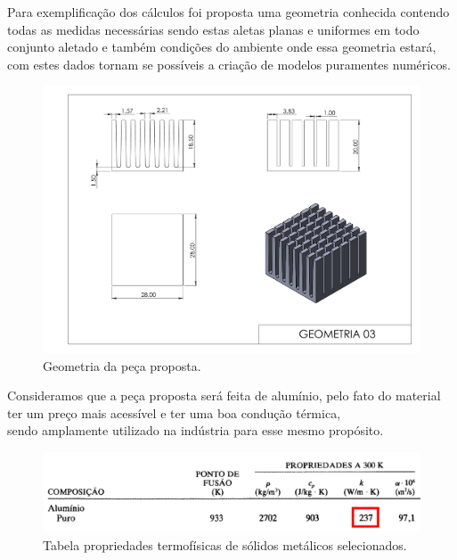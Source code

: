 
\vspace{-1.5cm}Para exemplificação dos cálculos foi proposta uma geometria conhecida contendo todas as medidas necessárias sendo estas aletas planas e uniformes em todo conjunto aletado e também condições do ambiente onde essa geometria estará, com estes dados tornam se possíveis a criação de modelos puramentes numéricos.
\vspace{-0.3cm}
\begin{figure}[h]
    \centering
    \caption{Geometria da peça proposta.}
    \label{fig:geometry}
    \includegraphics[width=14cm]{figuras/geometria.pdf}
\end{figure}

\vspace{-0.5cm}Consideramos que a peça proposta será feita de alumínio, pelo fato do material ter um preço mais acessível e ter uma boa condução térmica,
\\sendo amplamente utilizado na indústria para esse mesmo propósito.

\begin{figure}[h]
    \centering
    \caption{Tabela propriedades termofísicas de sólidos metálicos selecionados.}
    \label{fig:metalProps}
    \includegraphics[width=12cm]{figuras/metalProps.jpg}
\end{figure}
\newpage

